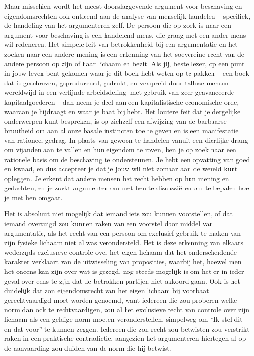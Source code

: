 Maar misschien wordt het meest doorslaggevende argument voor beschaving en eigendomsrechten ook ontleend aan de analyse van menselijk handelen -- specifiek, de handeling van het argumenteren zelf.\autocite{219} De persoon die op zoek is naar een argument voor beschaving is een handelend mens, die graag met een ander mens wil redeneren. Het simpele feit van betrokkenheid bij een argumentatie en het zoeken naar een andere mening is een erkenning van het soevereine recht van de andere persoon op zijn of haar lichaam en bezit. Als jij, beste lezer, op een punt in jouw leven bent gekomen waar je dit boek hebt weten op te pakken -- een boek dat is geschreven, geproduceerd, gedrukt, en verspreid door talloze mensen wereldwijd in een verfijnde arbeidsdeling, met gebruik van zeer geavanceerde kapitaalgoederen -- dan neem je deel aan een kapitalistische economische orde, waaraan je bijdraagt en waar je baat bij hebt. Het loutere feit dat je dergelijke onderwerpen kunt bespreken, is op zichzelf een afwijzing van de barbaarse bruutheid om aan al onze basale instincten toe te geven en is een manifestatie van rationeel gedrag. In plaats van gewoon te handelen vanuit een dierlijke drang om vijanden aan te vallen en hun eigendom te roven, ben je op zoek naar een rationele basis om de beschaving te ondersteunen. Je hebt een opvatting van goed en kwaad, en dus accepteer je dat je jouw wil niet zomaar aan de wereld kunt opleggen. Je erkent dat andere mensen het recht hebben op hun mening en gedachten, en je zoekt argumenten om met hen te discussiëren om te bepalen hoe je met hen omgaat.

\begin{blockquotebox}
    Het is absoluut niet mogelijk dat iemand iets zou kunnen voorstellen, of dat iemand overtuigd zou kunnen raken van een voorstel door middel van argumentatie, als het recht van een persoon om exclusief gebruik te maken van zijn fysieke lichaam niet al was verondersteld. Het is deze erkenning van elkaars wederzijds exclusieve controle over het eigen lichaam dat het onderscheidende karakter verklaart van de uitwisseling van proposities, waarbij het, hoewel men het oneens kan zijn over wat is gezegd, nog steeds mogelijk is om het er in ieder geval over eens te zijn dat de betrokken partijen niet akkoord gaan. Ook is het duidelijk dat zo\textquotesingle n eigendomsrecht van het eigen lichaam bij voorbaat gerechtvaardigd moet worden genoemd, want iedereen die zou proberen welke norm dan ook te rechtvaardigen, zou al het exclusieve recht van controle over zijn lichaam als een geldige norm moeten veronderstellen, simpelweg om ``Ik stel dit en dat voor'' te kunnen zeggen. Iedereen die zo\textquotesingle n recht zou betwisten zou verstrikt raken in een praktische contradictie, aangezien het argumenteren hiertegen al op de aanvaarding zou duiden van de norm die hij betwist.\footnotemark
\end{blockquotebox}

